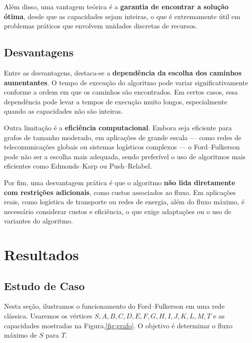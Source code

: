 \documentclass[12pt]{article}
\begin{document}
Além disso, uma vantagem teórica é a \textbf{garantia de encontrar a solução ótima}, desde que as capacidades sejam inteiras, o que é extremamente útil em problemas práticos que envolvem unidades discretas de recursos.






\subsection{Desvantagens}

Entre as desvantagens, destaca-se a \textbf{dependência da escolha dos caminhos aumentantes}. O tempo de execução do algoritmo pode variar significativamente conforme a ordem em que os caminhos são encontrados. Em certos casos, essa dependência pode levar a tempos de execução muito longos, especialmente quando as capacidades não são inteiras.

Outra limitação é a \textbf{eficiência computacional}. Embora seja eficiente para grafos de tamanho moderado, em aplicações de grande escala — como redes de telecomunicações globais ou sistemas logísticos complexos — o Ford–Fulkerson pode não ser a escolha mais adequada, sendo preferível o uso de algoritmos mais eficientes como Edmonds–Karp ou Push–Relabel.

Por fim, uma desvantagem prática é que o algoritmo \textbf{não lida diretamente com restrições adicionais}, como custos associados ao fluxo. Em aplicações reais, como logística de transporte ou redes de energia, além do fluxo máximo, é necessário considerar custos e eficiência, o que exige adaptações ou o uso de variantes do algoritmo.





\section{Resultados}
\subsection{Estudo de Caso} \label{sec:implementacao} 

Nesta seção, ilustramos o funcionamento do Ford–Fulkerson em uma rede clássica. Usaremos os vértices ${S, A, B, C, D, E, F, G, H, I, J, K, L , M, T}$ e as capacidades mostradas na Figura,\ref{fig:grafo}. O objetivo é determinar o fluxo máximo de $S$ para $T$.\vskip1.5cm
\end{document}
